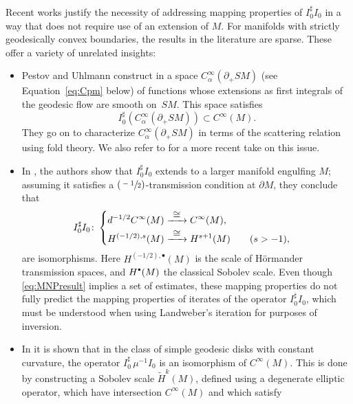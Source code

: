 \documentclass[11pt]{article}
\newcommand{\Psfrac}[2]{(\sfrac{#1}{#2})}
\newcommand{\bbullet}{{\scriptscriptstyle\bullet}}
\newcommand{\cbbullet}{{\raisebox{1pt}{$\bbullet$}}}
\def\To#1{\mathchoice{\xrightarrow{\textstyle\kern4pt#1\kern3pt}}{\stackrel{#1}{\longrightarrow}}{}{}}
\theoremstyle{plain}
\theoremstyle{definition}
\theoremstyle{remark}
\newcommand{\adj}{I_0^\sharp}
\newcommand{\wtH}{\widetilde{H}}
\newcommand{\del}{\partial}
\begin{document}
Recent works \cite{Monard2017,Monard2019,Monard2020a} justify the necessity of addressing mapping properties of $\adj I_0$ in a way
that does not require use of an extension of $M$. For manifolds with strictly geodesically convex boundaries, the results in the literature are sparse. These offer a variety of unrelated insights:
\begin{itemize}
\item Pestov and Uhlmann construct in \cite{Pestov2005} a space $C_{\alpha}^\infty(\partial_+ SM)$ (see Equation~\eqref{eq:Cpm} below)
of functions whose extensions as first integrals of the geodesic flow are smooth on~$SM$. This space satisfies
\begin{equation}
\adj (C_\alpha^\infty(\partial_+ SM)) \subset C^\infty(M).
\label{eq:PU}
\end{equation}
They go on to characterize $C_\alpha^\infty (\del_+ SM)$ in terms of the scattering relation using fold theory. We also refer to
\cite{Paternain2021} for a more recent take on this issue.
\item In \cite{Monard2017}, the authors show that $\adj I_0$ extends to a larger manifold engulfing $M$; assuming it
satisfies a $\Psfrac{-1}{2}$-transmission condition at $\partial M$, they conclude that
\begin{equation}
\adj I_0 \colon
\begin{cases}
\begin{aligned}
d^{-1/2} C^\infty(M) & \To{\cong} C^\infty(M), \\
H^{(-1/2), s}(M) & \To{\cong} H^{s+1}(M) \qquad (s>-1),
\end{aligned}
\end{cases}
\label{eq:MNPresult}
\end{equation}
are isomorphisms. Here $H^{(-1/2), \bbullet}(M)$ is the scale of Hörmander transmission spaces, and $H^{\cbbullet}(M)$ the classical Sobolev
scale. Even though \eqref{eq:MNPresult} implies a set of estimates, these mapping properties do not fully predict the mapping
properties of iterates of the operator $\adj I_0$, which must be understood when using Landweber's iteration for purposes of inversion.
\item In \cite{Monard2019a} it is shown that in the class of simple geodesic disks with constant curvature, the operator $\adj \, \mu^{-1} I_0$ is
an isomorphism of $C^\infty(M)$. This is done by constructing a Sobolev scale $\wtH^k(M)$, defined using a degenerate elliptic operator,
which have intersection $C^\infty(M)$ and which satisfy
\begin{equation*}

\end{equation*}
\end{itemize}
\end{document}
